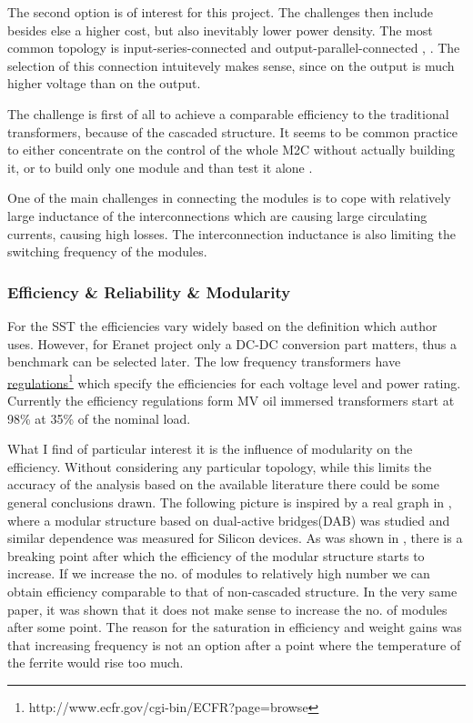 \documentclass[]{scrartcl}
\begin{document}
The second option is of interest for this project. The challenges then include besides else a higher cost, but also inevitably lower power density. The most common topology is input-series-connected and output-parallel-connected \cite{Fan2011}, \cite{wang2014}. The selection of this connection intuitevely makes sense, since on the output is much higher voltage than on the output. 

The challenge is first of all to achieve a comparable efficiency to the traditional transformers, because of the cascaded structure. It seems to be common practice to either concentrate on the control of the whole M2C without actually building it, or to build only one module and than test it alone \cite{Fan2011}. 

One of the main challenges in connecting the modules is to cope with relatively large inductance of the interconnections which are causing large circulating currents, causing high losses. The interconnection inductance is also limiting the switching frequency of the modules. 

\subsubsection{Efficiency \& Reliability \& Modularity}

For the SST the efficiencies vary widely based on the definition which author uses. However, for Eranet project only a DC-DC conversion part matters, thus a benchmark can be selected later. The low frequency transformers have \href{<http://www.ecfr.gov/cgi-bin/ECFR?page=browse>}{regulations}\footnote{http://www.ecfr.gov/cgi-bin/ECFR?page=browse} which specify the efficiencies for each voltage level and power rating. Currently the efficiency regulations form MV oil immersed transformers start at 98\% at 35\% of the nominal load. 

What I find of particular interest it is the influence of modularity on the efficiency. Without considering any particular topology, while this limits the accuracy of the analysis based on the available literature there could be some general conclusions drawn. 
%
The following picture is inspired by a real graph in \cite{Yang2014}, where a modular structure based on dual-active bridges(DAB) was studied and similar dependence was measured for Silicon devices. As was shown in \cite{Yang2014}, there is a breaking point after which the efficiency of the modular structure starts to increase. If we  increase the no. of modules to relatively high number we can obtain efficiency comparable to that of non-cascaded structure. In the very same paper, it was shown that it does not make sense to increase the no. of modules after some point. The reason for the saturation in efficiency and weight gains was that increasing frequency is not an option after a point where the temperature of the ferrite would rise too much. 
\end{document}
